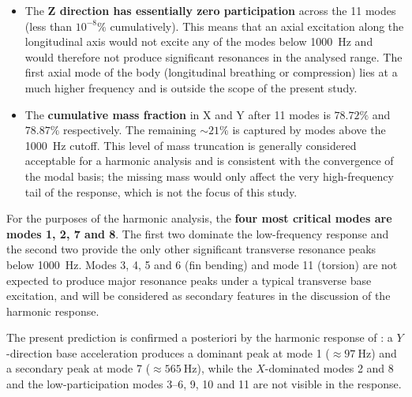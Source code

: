 \begin{itemize}
    \item The \textbf{Z direction has essentially zero participation} across the 11 modes (less than $10^{-8}\%$ cumulatively). This means that an axial excitation along the longitudinal axis would not excite any of the modes below \SI{1000}{\hertz} and would therefore not produce significant resonances in the analysed range. The first axial mode of the body (longitudinal breathing or compression) lies at a much higher frequency and is outside the scope of the present study.

    \item The \textbf{cumulative mass fraction} in X and Y after 11 modes is $78.72\%$ and $78.87\%$ respectively. The remaining $\sim 21\%$ is captured by modes above the \SI{1000}{\hertz} cutoff. This level of mass truncation is generally considered acceptable for a harmonic analysis and is consistent with the convergence of the modal basis; the missing mass would only affect the very high-frequency tail of the response, which is not the focus of this study.
\end{itemize}

For the purposes of the harmonic analysis, the \textbf{four most critical modes are modes 1, 2, 7 and 8}. The first two dominate the low-frequency response and the second two provide the only other significant transverse resonance peaks below \SI{1000}{\hertz}. Modes 3, 4, 5 and 6 (fin bending) and mode 11 (torsion) are not expected to produce major resonance peaks under a typical transverse base excitation, and will be considered as secondary features in the discussion of the harmonic response.

The present prediction is confirmed a posteriori by the harmonic response of : a $Y$-direction base acceleration produces a dominant peak at mode 1 ($\approx \SI{97}{\hertz}$) and a secondary peak at mode 7 ($\approx \SI{565}{\hertz}$), while the $X$-dominated modes 2 and 8 and the low-participation modes 3--6, 9, 10 and 11 are not visible in the response.
